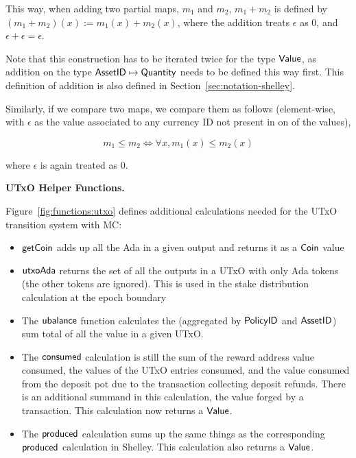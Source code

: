 This way, when adding two partial maps, $m_1$ and $m_2$, $m_1 + m_2$ is defined
by $(m_1 + m_2)(x) := m_1(x) + m_2(x)$, where the addition treats $\epsilon$ as
$0$, and $\epsilon + \epsilon = \epsilon$.

Note that this construction has to be iterated twice for the type $\mathsf{Value}$, as
addition on the type $\mathsf{AssetID} \mapsto \mathsf{Quantity}$ needs to be defined this way first.
This definition of addition is also defined in
Section~\ref{sec:notation-shelley}.

Similarly, if we compare two maps, we compare them as follows (element-wise,
with $\epsilon$ as the value associated to any currency ID not present in on of
the values),

\[ m_1 \leq m_2 \Leftrightarrow \forall x, m_1(x) \leq m_2(x) \]

where $\epsilon$ is again treated as $0$.

\textbf{UTxO Helper Functions.}

Figure~\ref{fig:functions:utxo} defines additional calculations needed for the
UTxO transition system with MC:

\begin{itemize}

  \item $\mathsf{getCoin}$ adds up all the Ada in a given output and returns it as a
  $\mathsf{Coin}$ value

  \item $\mathsf{utxoAda}$ returns the set of all the outputs in a UTxO with only Ada
  tokens (the other tokens are ignored). This is used in the stake distribution
  calculation at the epoch boundary

  \item
    The $\mathsf{ubalance}$ function calculates the (aggregated by $\mathsf{PolicyID}$ and
    $\mathsf{AssetID}$) sum total of all the value in a given UTxO.

  \item The $\mathsf{consumed}$ calculation is still the sum of the reward address
   value consumed, the values of the UTxO entries consumed,
   and the value consumed from the deposit pot due
   to the transaction collecting deposit refunds. There is an additional
   summand in this calculation, the value forged by a transaction.
   This calculation now returns a $\mathsf{Value}$.

  \item The $\mathsf{produced}$ calculation sums up the same things
  as the corresponding $\mathsf{produced}$ calculation in Shelley.
  This calculation also returns a $\mathsf{Value}$.
\end{itemize}

